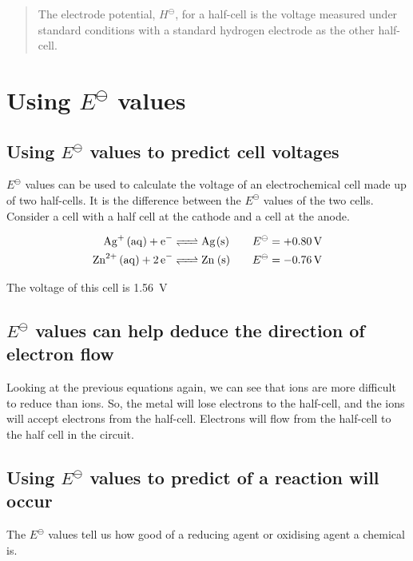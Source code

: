 \documentclass{scrbook}
\begin{document}
	\begin{quote}
		The electrode potential, $H^\ominus$, for a half-cell is the voltage measured under standard conditions with a standard hydrogen electrode as the other half-cell.
	\end{quote}

\section{Using $E^\ominus$ values}

\subsection{Using $E^\ominus$ values to predict cell voltages}

	$E^\ominus$ values can be used to calculate the voltage of an electrochemical cell made up of two half-cells. It is the difference between the $E^\ominus$ values of the two cells. Consider a cell with a  half cell at the cathode and a  cell at the anode.

	\begin{align*}
		\ce{ Ag+ (aq) + e- &<=> Ag(s) } && &E^\ominus &= \SI[explicit-sign=+]{0.80}{\volt} \\
		\ce{ Zn^{2+} (aq) +2e- &<=> Zn (s) } && &E^\ominus &= \SI[explicit-sign=+]{-0.76}{\volt}
	\end{align*}

	The voltage of this cell is \SI{1.56}{\volt}

\subsection{$E^\ominus$ values can help deduce the direction of electron flow}

	Looking at the previous equations again, we can see that  ions are more difficult to reduce than  ions. So, the  metal will lose electrons to the  half-cell, and the  ions will accept electrons from the  half-cell. Electrons will flow from the  half-cell to the  half cell in the circuit.

\subsection{Using $E^\ominus$ values to predict of a reaction will occur}

	The $E^\ominus$ values tell us how good of a reducing agent or oxidising agent a chemical is.
\end{document}
